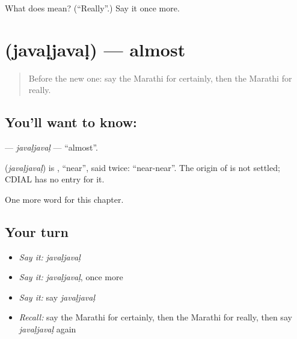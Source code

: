 \begin{tcolorbox}[breakable,colback=teal!4,colframe=teal!35!black,title={Before you move on}]
What does  mean? (\textquotedblleft{}Really\textquotedblright{}.) Say it once more.
\end{tcolorbox}
\section[\texorpdfstring{\mr{जवळजवळ} (javaḷjavaḷ)}{जवळजवळ (javaḷjavaḷ)}]{ (javaḷjavaḷ) — almost}

\label{lesson:MR-C203-javaljaval}



\begin{quote}
Before the new one: say the Marathi for certainly, then the Marathi for really.
\end{quote}

\subsection*{You'll want to know: }
\textbf{} — \emph{javaḷjavaḷ} — \textquotedblleft{}almost\textquotedblright{}.

\begin{cousinweb}
\textbf{} (\emph{javaḷjavaḷ}) is \textbf{}, \textquotedblleft{}near\textquotedblright{}, said twice: \textquotedblleft{}near-near\textquotedblright{}. The origin of \textbf{} is not settled; CDIAL has no entry for it.
\end{cousinweb}

\begin{grammarlens}[title={What you've built}]
One more word for this chapter.
\end{grammarlens}

\subsection*{Your turn}
\begin{itemize}
\raggedright
  \item \emph{Say it:} \emph{javaḷjavaḷ}
  \item \emph{Say it:} \emph{javaḷjavaḷ}, once more
  \item \emph{Say it:} say \emph{javaḷjavaḷ}
  \item \emph{Recall:} say the Marathi for certainly, then the Marathi for really, then say \emph{javaḷjavaḷ} again
\end{itemize}

